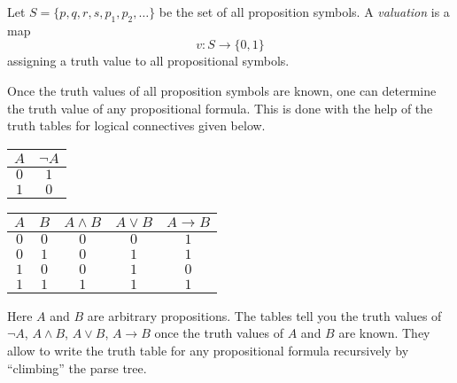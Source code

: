\begin{page}

\begin{dfn}
Let $S = \{p, q, r, s, p_1, p_2, \ldots\}$ be the set of all proposition symbols.
A \emph{valuation} is a map
\[
v \colon S \to \{0,1\}
\]
assigning a truth value to all propositional symbols.
\end{dfn}

\end{page}

\begin{page}


Once the truth values of all proposition symbols are known, one can determine the truth value of any propositional formula.
This is done with the help of the truth tables for logical connectives given below.

\begin{center}
\begin{tabular}{|c||c|}
\hline
$A$ & $\neg A$\\\hline
$0$ & $1$\\\hline
$1$ & $0$\\\hline
\end{tabular}
\hspace{2cm}
\begin{tabular}{|c|c||c|c|c|}
\hline
$A$ & $B$ & $A \wedge B$ & $A \vee B$ & $A \to B$\\\hline
$0$ & $0$ & $0$ & $0$ & $1$\\\hline
$0$ & $1$ & $0$ & $1$ & $1$\\\hline
$1$ & $0$ & $0$ & $1$ & $0$\\\hline
$1$ & $1$ & $1$ & $1$ & $1$\\\hline
\end{tabular}
\end{center}

Here $A$ and $B$ are arbitrary propositions.
The tables tell you the truth values of $\neg A$, $A \wedge B$, $A \vee B$, $A \to B$ once the truth values of $A$ and $B$ are known.
They allow to write the truth table for any propositional formula recursively by ``climbing'' the parse tree.


\end{page}

